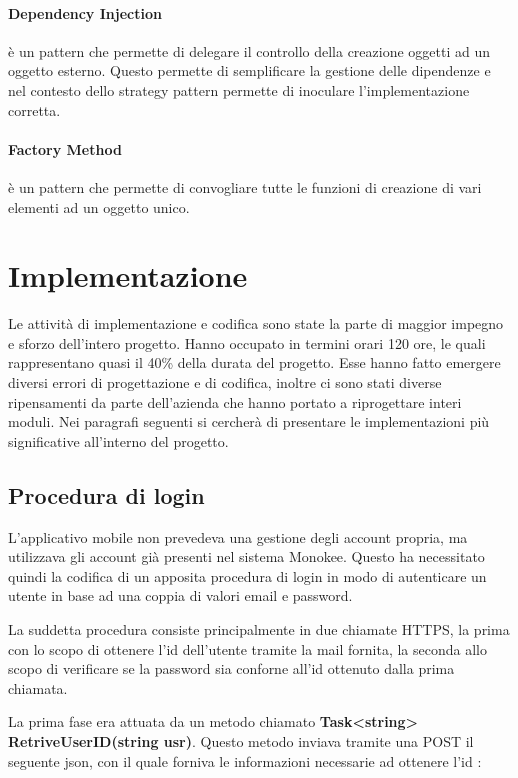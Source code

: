\paragraph{Dependency Injection} è un pattern che permette di delegare il controllo della creazione oggetti ad un oggetto esterno. Questo permette di semplificare la gestione delle dipendenze e nel contesto dello strategy pattern permette di inoculare l’implementazione corretta. 
\paragraph{Factory Method} è un pattern che permette di convogliare tutte le funzioni di creazione di vari elementi ad un oggetto unico. 

\section{Implementazione}

Le attività di implementazione e codifica sono state la parte di maggior impegno e sforzo dell'intero progetto. Hanno occupato in termini orari 120 ore, le quali rappresentano quasi il 40\% della durata del progetto. Esse hanno fatto emergere diversi errori di progettazione e di codifica, inoltre ci sono stati diverse ripensamenti da parte dell'azienda che hanno portato a riprogettare interi moduli. Nei paragrafi seguenti si cercherà di presentare le implementazioni più significative all'interno del progetto.

\subsection{Procedura di login}
L'applicativo mobile non prevedeva una gestione degli account propria, ma utilizzava gli account già presenti nel sistema Monokee. Questo ha necessitato quindi la codifica di un apposita procedura di login in modo di autenticare un utente in base ad una coppia di valori email e password. 

La suddetta procedura consiste principalmente in due chiamate HTTPS, la prima con lo scopo di ottenere l'id dell'utente tramite la mail fornita, la seconda allo scopo di verificare se la password sia conforne all'id ottenuto dalla prima chiamata. 

La prima fase era attuata da un metodo chiamato \textbf{Task<string> RetriveUserID(string usr)}. Questo metodo inviava tramite una POST il seguente json, con il quale forniva le informazioni necessarie ad ottenere l'id :

